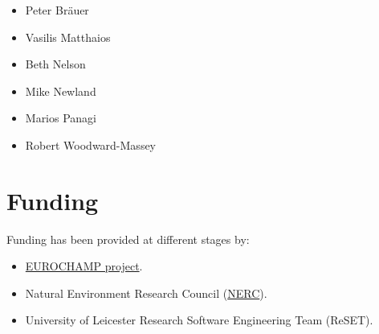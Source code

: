 \begin{itemize}
\item Peter Br{\"a}uer
\item Vasilis Matthaios
\item Beth Nelson
\item Mike Newland
\item Marios Panagi
\item Robert Woodward-Massey
\end{itemize}

\section{Funding} \label{sec:funding}

Funding has been provided at different stages by:

\begin{itemize}
\item \href{https://www.eurochamp.org/}{EUROCHAMP project}.
\item Natural Environment Research Council (\href{https://nerc.ukri.org/}{NERC}).
\item University of Leicester Research Software Engineering Team (ReSET).
\end{itemize}
